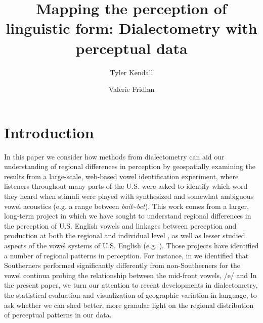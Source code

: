 \documentclass[output=paper]{LSP/langsci}
\author{Tyler Kendall\affiliation{University of Oregon, USA} \and Valerie Fridlan\affiliation{University of Nevada, Reno, USA}}
\title{Mapping the perception of linguistic form: Dialectometry with perceptual data}
\begin{document}
 

% 
% 
% 
% 
 
\section{Introduction}

In this paper we consider how methods from dialectometry can aid our understanding of regional differences in perception by geospatially examining the results from a large-scale, web-based vowel identification experiment, where listeners throughout many parts of the U.S. were asked to identify which word they heard when stimuli were played with synthesized and somewhat ambiguous vowel acoustics (e.g. a range between \textit{bait}\~{}\textit{bet}). This work comes from a larger, long-term project in which we have sought to understand regional differences in the perception of U.S. English vowels and linkages between perception and production at both the regional and individual level \citep{fridland_exploring_2012,kendall_mapping_2010,kendall_variation_2012}, as well as lesser studied aspects of the vowel systems of U.S. English (e.g. \citealt{fridland_durational_2014}). Those projects have identified a number of regional patterns in perception. For instance, in \cite{kendall_variation_2012} we identified that Southerners performed significantly differently from non-Southerners for the vowel continua probing the relationship between the mid-front vowels, /e/ and 
In the present paper, we turn our attention to recent developments in dialectometry, the statistical evaluation and visualization of geographic variation in language, to ask whether we can shed better, more granular light on the regional distribution of perceptual patterns in our data. 
\end{document}
